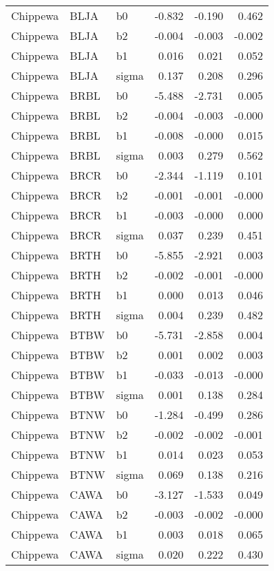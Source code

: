 \begin{table}[ht]
\begin{center}
\begin{tabular}{lllrrr}
  Chippewa & BLJA & b0 & -0.832 & -0.190 & 0.462 \\ 
  Chippewa & BLJA & b2 & -0.004 & -0.003 & -0.002 \\ 
  Chippewa & BLJA & b1 & 0.016 & 0.021 & 0.052 \\ 
  Chippewa & BLJA & sigma & 0.137 & 0.208 & 0.296 \\ 
  Chippewa & BRBL & b0 & -5.488 & -2.731 & 0.005 \\ 
  Chippewa & BRBL & b2 & -0.004 & -0.003 & -0.000 \\ 
  Chippewa & BRBL & b1 & -0.008 & -0.000 & 0.015 \\ 
  Chippewa & BRBL & sigma & 0.003 & 0.279 & 0.562 \\ 
  Chippewa & BRCR & b0 & -2.344 & -1.119 & 0.101 \\ 
  Chippewa & BRCR & b2 & -0.001 & -0.001 & -0.000 \\ 
  Chippewa & BRCR & b1 & -0.003 & -0.000 & 0.000 \\ 
  Chippewa & BRCR & sigma & 0.037 & 0.239 & 0.451 \\ 
  Chippewa & BRTH & b0 & -5.855 & -2.921 & 0.003 \\ 
  Chippewa & BRTH & b2 & -0.002 & -0.001 & -0.000 \\ 
  Chippewa & BRTH & b1 & 0.000 & 0.013 & 0.046 \\ 
  Chippewa & BRTH & sigma & 0.004 & 0.239 & 0.482 \\ 
  Chippewa & BTBW & b0 & -5.731 & -2.858 & 0.004 \\ 
  Chippewa & BTBW & b2 & 0.001 & 0.002 & 0.003 \\ 
  Chippewa & BTBW & b1 & -0.033 & -0.013 & -0.000 \\ 
  Chippewa & BTBW & sigma & 0.001 & 0.138 & 0.284 \\ 
  Chippewa & BTNW & b0 & -1.284 & -0.499 & 0.286 \\ 
  Chippewa & BTNW & b2 & -0.002 & -0.002 & -0.001 \\ 
  Chippewa & BTNW & b1 & 0.014 & 0.023 & 0.053 \\ 
  Chippewa & BTNW & sigma & 0.069 & 0.138 & 0.216 \\ 
  Chippewa & CAWA & b0 & -3.127 & -1.533 & 0.049 \\ 
  Chippewa & CAWA & b2 & -0.003 & -0.002 & -0.000 \\ 
  Chippewa & CAWA & b1 & 0.003 & 0.018 & 0.065 \\ 
  Chippewa & CAWA & sigma & 0.020 & 0.222 & 0.430 \\ 

\end{tabular}
\end{center}
\end{table}
